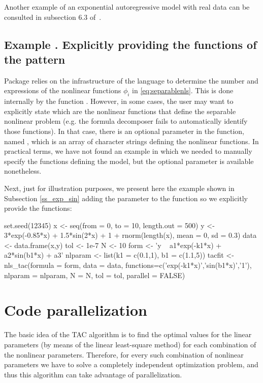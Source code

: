 Another example of an exponential autoregressive model with real data can be consulted in subsection 6.3 of~\citet{tac_mdpi}.




\addtocounter{n}{1}
\subsection{Example . Explicitly providing the functions of the pattern}\label{ss_function_explicit}
Package  relies on the  infrastructure of the  language to determine the number and expressions of the nonlinear functions $\phi_i$ in \eqref{eq:separablenls}. This is done internally by the function . However, in some cases, the user may want to explicitly state which are the nonlinear functions that define the separable nonlinear problem (e.g. the formula decomposer fails to automatically identify those functions). In that case, there is an optional parameter in the  function, named , which is an array of character strings defining the nonlinear functions. In practical terms, we have not found an example in which we needed to manually specify the functions defining the model, but the optional parameter is available nonetheless.

Next, just for illustration purposes, we present here the example shown in Subsection \ref{ss_exp_sin} adding the  parameter to the function  so we explicitly provide the functions:

\begin{example}
  set.seed(12345)
  x <- seq(from = 0, to = 10, length.out = 500)
  y <- 3*exp(-0.85*x) + 1.5*sin(2*x) + 1 + rnorm(length(x), mean = 0, sd = 0.3)
  data <- data.frame(x,y)
  tol <- 1e-7
  N <- 10
  form <- 'y ~ a1*exp(-k1*x) + a2*sin(b1*x) + a3'
  nlparam <- list(k1 = c(0.1,1), b1 = c(1.1,5))
  tacfit <- nls_tac(formula = form, data = data, 
    functions=c('exp(-k1*x)','sin(b1*x)','1'),  nlparam = nlparam, N = N, tol = tol, 
    parallel = FALSE)
\end{example}





\section{Code parallelization}

The basic idea of the TAC algorithm is to find the optimal values for the linear parameters (by means of the linear least-square method) for each combination of the nonlinear parameters. Therefore, for every such combination of nonlinear parameters we have to solve a completely independent optimization problem, and thus this algorithm can take advantage of parallelization. 

